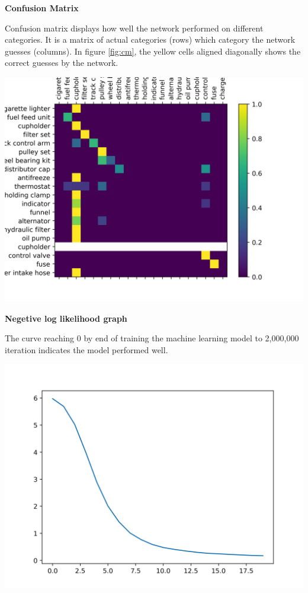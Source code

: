 \documentclass{article}
\renewcommand{\subsection}[1]{
        {\textbf{#1}}

}
\newenvironment{Figure}
  {\par\medskip\noindent\minipage{\linewidth}}
  {\endminipage\par\medskip}
\begin{document}
\begin{multicols*}{3}
\begin{center}
    \end{center}

    \subsection{Confusion Matrix}
    Confusion matrix displays how well the network performed on different categories. It is a matrix of actual categories (rows) which category the network guesses (columns). In figure \ref{fig:cm}, the yellow cells aligned diagonally shows the correct guesses by the network.

    \begin{Figure}
        \centering
        \includegraphics[width=0.50\linewidth]{confusion._200epoch}
        \captionsetup{font=footnotesize}
        \label{fig:cm}
    \end{Figure}


    \subsection{Negetive log likelihood graph}
    The curve reaching 0 by end of training the machine learning model to 2,000,000 iteration indicates the model performed well.

    \begin{Figure}
        \centering
        \includegraphics[width=0.50\linewidth]{loss}
        \captionsetup{font=footnotesize}
        \label{fig:loss}
    \end{Figure}


\end{multicols*}
\end{document}
